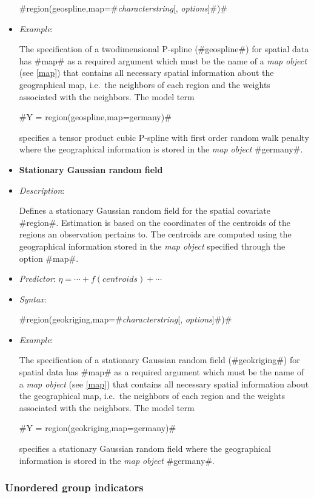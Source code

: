 \begin{itemize}
#region(geospline,map=#{\em characterstring}[, {\em options}]#)#
\item[] {\em Example}:

The specification of a twodimensional P-spline  (#geospline#) for
spatial data has #map# as a required argument which must be the name
of a {\em map object} (see \autoref{map}) that contains all
necessary spatial information about the geographical map, i.e.~the
neighbors of each region and the weights associated with the
neighbors. The model term

#Y = region(geospline,map=germany)#

specifies a tensor product cubic P-spline with first order random
walk penalty where the geographical information is stored in the
{\em map object} #germany#.

\item[]{\bf\sffamily Stationary Gaussian random field}

\item[] {\em Description}:

Defines a stationary Gaussian random field for the spatial covariate
#region#. Estimation is based on the coordinates of the centroids of
the regions an observation pertains to. The centroids are computed
using the geographical information stored in the {\em map object}
specified through the option #map#.
\item[] {\em Predictor}: $\eta= \cdots + f(centroids) + \cdots$
\item[] {\em Syntax}:

#region(geokriging,map=#{\em characterstring}[, {\em options}]#)#
\item[] {\em Example}:

The specification of a stationary Gaussian random field
(#geokriging#) for spatial data has #map# as a required argument
which must be the name of a {\em map object} (see \autoref{map})
that contains all necessary spatial information about the
geographical map, i.e.~the neighbors of each region and the weights
associated with the neighbors. The model term

#Y = region(geokriging,map=germany)#

specifies a stationary Gaussian random field where the geographical
information is stored in the {\em map object} #germany#.
\end{itemize}

\subsubsection*{Unordered group indicators}

